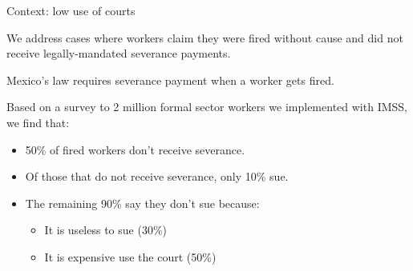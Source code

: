 \documentclass[9pt]{beamer}
\begin{document}
\begin{frame}{Context: low use of courts}

We address cases where workers claim they were fired without cause and did not receive legally-mandated severance payments.

\vspace{.1in}

Mexico's law requires severance payment when a worker gets fired.

\vspace{.2in}
Based on a survey to 2 million formal sector workers we implemented with IMSS, we find that:

\vspace{.1in}
\begin{itemize}
    \item 50\% of fired workers don't receive severance.
    \vspace{.1in}
    \item Of those that do not receive severance, only 10\% sue. 
    \vspace{.1in}
    \item The remaining 90\% say they don't sue because:
    \begin{itemize}
        \item It is useless to sue (30\%)
        \item It is expensive use the court (50\%)
        
    \end{itemize}
    \vspace{.1in}
    \vspace{.1in}

\end{itemize}
\end{frame}


\end{document}
